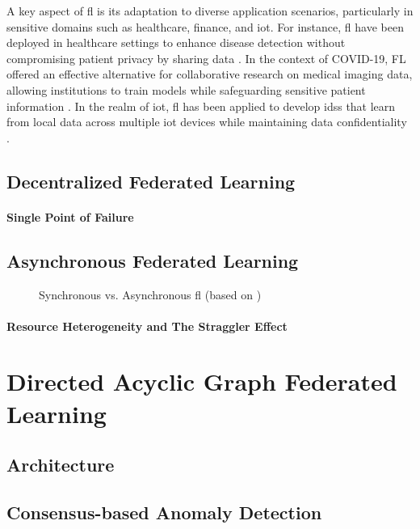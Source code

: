 A key aspect of \ac{fl} is its adaptation to diverse application scenarios, particularly in sensitive domains such as healthcare, finance, and \ac{iot}. For instance, \ac{fl} have been deployed in healthcare settings to enhance disease detection without compromising patient privacy by sharing data \cite{lee_federated_2021}. In the context of COVID-19, FL offered an effective alternative for collaborative research on medical imaging data, allowing institutions to train models while safeguarding sensitive patient information \cite{liu_experiments_2020}. In the realm of \ac{iot}, \ac{fl} has been applied to develop \acp{ids} that learn from local data across multiple \ac{iot} devices while maintaining data confidentiality \cite{gitanjali_fediotect_2024}.

\newpage
\subsection{Decentralized Federated Learning}
\paragraph{Single Point of Failure}


\newpage
\subsection{Asynchronous Federated Learning}
\begin{figure}[htbp]
    \centerline{}
    \caption[Synchronous vs. Asynchronous Federated Learning]{Synchronous vs. Asynchronous \ac{fl} (based on \cite{ko_asynchronous_2023})}
    \label{fig:synchronous_fl}
\end{figure}
\paragraph{Resource Heterogeneity and The Straggler Effect}



\newpage
\section{Directed Acyclic Graph Federated Learning}

\subsection{Architecture}
\subsection{Consensus-based Anomaly Detection}

